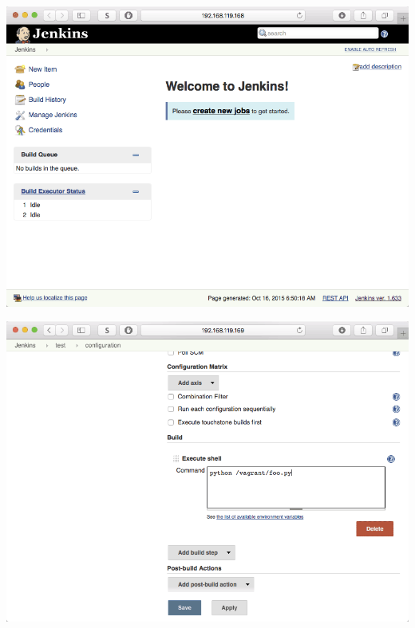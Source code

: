 \documentclass[xcolor=svgnames,17pt]{beamer}
\begin{document}
\begin{frame}[plain]{}
\includegraphics[width=\paperwidth,frame,center]{hello-1-create-job.png}
\end{frame}

\begin{frame}[plain]{}
\includegraphics[width=\paperwidth,frame,center]{hello-2-config.png}
\end{frame}
\end{document}
